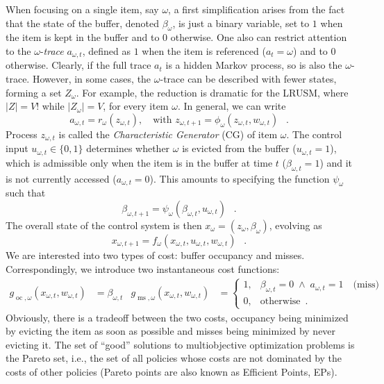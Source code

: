 \documentclass[11pt,a4paper]{article}
\DeclareMathOperator{\oc}{oc}
\DeclareMathOperator{\ms}{ms}
\DeclareMathOperator{\mf}{\enspace .}
\theoremstyle{definition}
\theoremstyle{remark}
\begin{document}
When focusing on a single item, say $\omega$, a first simplification
arises from the fact that the state of the buffer, denoted
$\beta_\omega$, is just a binary variable, set to $1$ when the item is
kept in the buffer and to $0$ otherwise.  One also can restrict
attention to the $\omega$-\emph{trace} $a_{\omega,t}$, defined as $1$
when the item is referenced ($a_t=\omega$) and to $0$ otherwise.
Clearly, if the full trace $a_t$ is a hidden Markov process, so is
also the $\omega$-trace. However, in some cases, the $\omega$-trace
can be described with fewer states, forming a set $Z_\omega$. For
example, the reduction is dramatic for the LRUSM, where $|Z|=V!$ while
$|Z_\omega|=V$, for every item $\omega$. In general, we can write
\begin{equation}\label{eqn:phiOmega}
a_{\omega,t} = r_{\omega}(z_{\omega,t}), \quad \text{with }
z_{\omega,t+1}= \phi_\omega(z_{\omega,t}, w_{\omega,t}) \mf
\end{equation}
Process $z_{\omega,t}$ is called the \emph{Characteristic Generator}
(CG) of item $\omega$.  The control input $u_{\omega,t} \in \{0,1\}$
determines whether $\omega$ is evicted from the buffer ($u_{\omega,t}=1$),
which is admissible only when the item is in the buffer at time $t$
($\beta_{\omega,t}=1$) and it is not currently accessed
($a_{\omega,t}=0$). This amounts to specifying the function
$\psi_\omega$ such that
\begin{equation}\label{eqn:psiOmega}
\beta_{\omega,t+1} = \psi_\omega(\beta_{\omega,t}, u_{\omega,t}) \mf
\end{equation}
The overall state of the control system is then $x_\omega = (z_\omega,
\beta_\omega)$, evolving as
\begin{equation}\label{eqn:fOmega}
x_{\omega,t+1} = f_\omega(x_{\omega,t}, u_{\omega,t}, w_{\omega,t}) \mf
\end{equation}
We are interested into two types of cost: buffer occupancy and misses.
Correspondingly, we introduce two instantaneous cost functions:
\begin{align}\label{eqn:gOmega}
  g_{\oc, \omega}(x_{\omega,t}, w_{\omega,t})& = \beta_{\omega,t}&
  g_{\ms, \omega}(x_{\omega,t}, w_{\omega,t})& =
  \begin{cases}
    1, &\beta_{\omega,t}=0 \; \wedge \; a_{\omega,t}=1 \quad \text{(miss)} \\
    0, & \text{otherwise} \mf
  \end{cases}
\end{align}
Obviously, there is a tradeoff between the two costs, occupancy being
minimized by evicting the item as soon as possible and misses being minimized by
never evicting it. The set of ``good'' solutions to multiobjective optimization
problems is the Pareto set, i.e., the set of all policies whose costs are not
dominated by the costs of other policies (Pareto points are also known as
Efficient Points, EPs).
\end{document}
